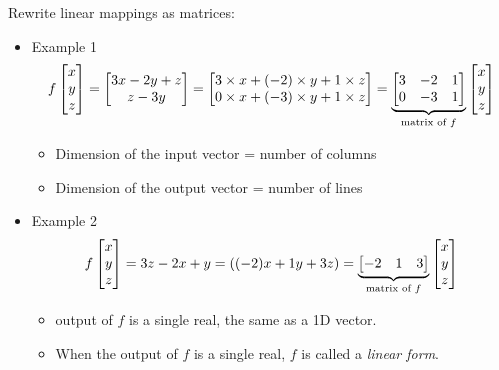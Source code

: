 \documentclass[8pt,dvipsnames]{beamer}
\begin{document}
\begin{frame}
Rewrite linear mappings as matrices:
  \begin{itemize}
    \item Example 1
    $$f
    \begin{bmatrix}
      x\\y\\z
    \end{bmatrix}
    = \begin{bmatrix}
      3x -2y + z\\
      z -3y
    \end{bmatrix} =  
    \begin{bmatrix}
      3\times x + (-2)\times y + 1\times z\\
      0\times x + (-3)\times y + 1\times z
    \end{bmatrix}
    =\underset{\text{matrix of }f}{\underbrace{
    \begin{bmatrix}
      3 & -2 & 1\\
      0 & -3 & 1
    \end{bmatrix}}}\begin{bmatrix}
      x\\y\\z
    \end{bmatrix}
    $$
    \begin{itemize}
      \item Dimension of the input vector = number of columns
      \item Dimension of the output vector = number of lines
    \end{itemize}
  \item Example 2
  $$
  f\begin{bmatrix}
      x\\y\\z
    \end{bmatrix} = 3z - 2x + y = ((-2)x + 1y + 3z) = 
    \underset{\text{matrix of }f}{\underbrace{
    \begin{bmatrix}
      -2 & 1 & 3
    \end{bmatrix}}} \begin{bmatrix}
      x\\y\\z
    \end{bmatrix}
    $$
    \begin{itemize}
      \item output of $f$ is a single real, the same as a 1D vector. 
      \item When the output of $f$ is a single real, $f$ is called a \emph{linear form}.

\end{itemize}
\end{itemize}
\end{frame}
\end{document}
